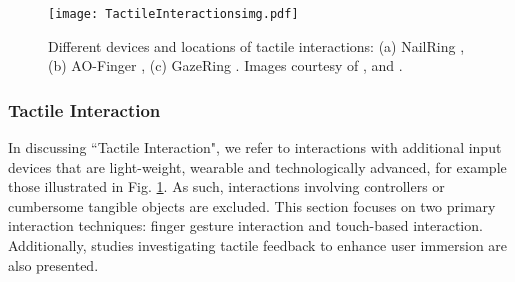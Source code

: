 \documentclass[review]{fcs}
\newcommand{\revise}[2]{\textcolor[rgb]{0,0,0}{#2}}
\begin{document}
\begin{figure}
    \begin{center}
    \texttt{[image: TactileInteractionsimg.pdf]}
    \end{center}
    \caption{
        \revise{}{Different devices and locations of tactile interactions: (a) NailRing \cite{DBLP:conf/ismar/LiLMHLS22}, (b) AO-Finger \cite{DBLP:conf/chi/XuZKN23}, (c) GazeRing \cite{DBLP:conf/ismar/WangSHRS024}. Images courtesy of \cite{DBLP:conf/ismar/LiLMHLS22}, \cite{DBLP:conf/chi/XuZKN23} and \cite{DBLP:conf/ismar/WangSHRS024}.}
    }
    \label{fig:TactileInteractions}
\end{figure}


\subsubsection{Tactile Interaction}
\label{Tactile}

\revise{In discussing ``Tactile Interactions", we refer to interactions with additional input devices that are light-weight, wearable and technologically advanced.}{In discussing ``Tactile Interaction", we refer to interactions with additional input devices that are light-weight, wearable and technologically advanced, for example those illustrated in Fig. \ref{fig:TactileInteractions}.}
As such, interactions involving controllers or cumbersome tangible objects are excluded. This section focuses on two primary interaction techniques: finger gesture interaction and touch-based interaction. Additionally, studies investigating tactile feedback to enhance user immersion are also presented.
\end{document}
